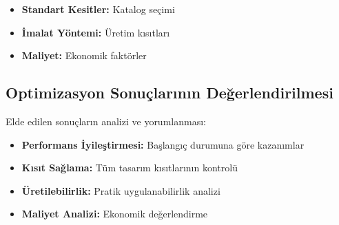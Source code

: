 \begin{itemize}
    \item \textbf{Standart Kesitler:} Katalog seçimi
    \item \textbf{İmalat Yöntemi:} Üretim kısıtları
    \item \textbf{Maliyet:} Ekonomik faktörler
\end{itemize}


\subsection{Optimizasyon Sonuçlarının Değerlendirilmesi}
Elde edilen sonuçların analizi ve yorumlanması:

\begin{tcolorbox}[title=Değerlendirme Kriterleri]
\begin{itemize}
    \item \textbf{Performans İyileştirmesi:} Başlangıç durumuna göre kazanımlar
    \item \textbf{Kısıt Sağlama:} Tüm tasarım kısıtlarının kontrolü
    \item \textbf{Üretilebilirlik:} Pratik uygulanabilirlik analizi
    \item \textbf{Maliyet Analizi:} Ekonomik değerlendirme
\end{itemize}
\end{tcolorbox}